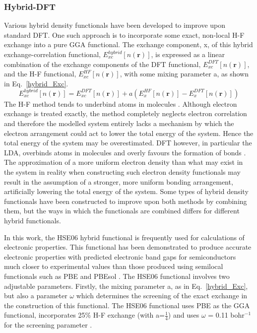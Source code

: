 \documentclass[11pt, twoside]{report}
\begin{document}

\subsubsection{Hybrid-DFT}\label{hse_theory}
Various hybrid density functionals have been developed to improve upon standard DFT. One such approach is to incorporate some exact, non-local H-F exchange into a pure GGA functional. The exchange component, x, of this hybrid exchange-correlation functional, $E_{xc}^{hybrid}[n(\mathbf{r})]$, is expressed as a linear combination of the exchange components of the DFT functional, $E_{xc}^{DFT}[n(\mathbf{r})]$, and the H-F functional, $E_{xc}^{HF}[n(\mathbf{r})]$, with some mixing parameter a, as shown in Eq.~\ref{hybrid_Exc}.
\begin{equation}\label{hybrid_Exc}
E_{xc}^{hybrid}[n(\mathbf{r})] = E_{xc}^{DFT}[n(\mathbf{r})] + a(E_{x}^{HF}[n(\mathbf{r})] - E_{x}^{DFT}[n(\mathbf{r})])
\end{equation}
The H-F method tends to underbind atoms in molecules \cite{DFT_delocalisation}. Although electron exchange is treated exactly, the method completely neglects electron correlation and therefore the modelled system entirely lacks a mechanism by which the electron arrangement could act to lower the total energy of the system. Hence the total energy of the system may be overestimated. DFT however, in particular the LDA, overbinds atoms in molecules and overly favours the formation of bonds \cite{DFT_delocalisation}. The approximation of a more uniform electron density than what may exist in the system in reality when constructing such electron density functionals may result in the assumption of a stronger, more uniform bonding arrangement, artificially lowering the total energy of the system. Some types of hybrid density functionals have been constructed to improve upon both methods by combining them, but the ways in which the functionals are combined differs for different hybrid functionals.

In this work, the HSE06 hybrid functional \cite{HSE2} is frequently used for calculations of electronic properties. This functional has been demonstrated to produce accurate electronic properties with predicted electronic band gaps for semiconductors much closer to experimental values than those produced using semilocal functionals such as PBE and PBEsol \cite{HSEsol}.
The HSE06 functional involves two adjustable parameters. Firstly, the mixing parameter a, as in Eq.~\ref{hybrid_Exc}, but also a parameter $\omega$ which determines the screening of the exact exchange in the construction of this functional. 
The HSE06 functional uses PBE as the GGA functional, incorporates 25\% H-F exchange (with a=$\frac{1}{4}$) and uses $\omega$ = 0.11 bohr$^{-1}$ for the screening parameter \cite{HSE2}.
\end{document}
